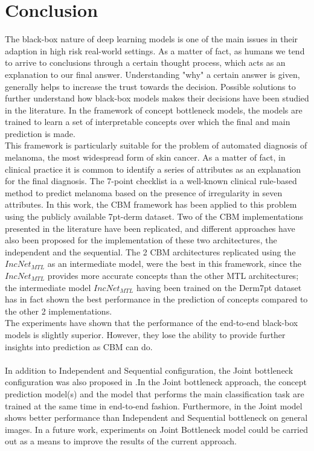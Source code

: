\graphicspath{{chapters/chapter6/}}
\chapter{Conclusion} \label{chapter6}
The black-box nature of deep learning models is one of the main issues in their adaption in high risk real-world settings. As a matter of fact, as humans we tend to arrive to conclusions through a certain thought process, which acts as an explanation to our final answer. Understanding "why" a certain answer is given, generally helps to increase the trust towards the decision.
Possible solutions to further understand how black-box models makes their decisions have been studied in the literature. In the framework of concept bottleneck models, the models are trained to learn a set of interpretable concepts over which the final and main prediction is made.\\
This framework is particularly suitable for the problem of automated diagnosis of melanoma, the most widespread form of skin cancer. As a matter of fact, in clinical practice it is common to identify a series of attributes as an explanation for the final diagnosis. The 7-point checklist ia a well-known clinical rule-based method to predict melanoma based on the presence of irregularity in seven attributes.
In this work, the CBM framework has been applied to this problem using the publicly available 7pt-derm dataset. Two of the CBM implementations presented in the literature have been replicated, and different approaches have also been proposed for the implementation of these two architectures, the independent and the sequential.
The 2 CBM architectures replicated using the $ IncNet_ {MTL} $ as an intermediate model, were the best in this framework, since the $ IncNet_ {MTL} $ provides more accurate concepts than the other MTL architectures; the intermediate model $ IncNet_ {MTL} $ having been trained on the Derm7pt dataset has in fact shown the best performance in the prediction of concepts compared to the other 2 implementations. \\
The experiments have shown that the performance of the end-to-end black-box models is slightly superior. However, they lose the ability to provide further insights into prediction as CBM can do.\\\\
In addition to Independent and Sequential configuration, the Joint bottleneck configuration was also proposed in \cite{CBM}.In the Joint bottleneck approach, the concept prediction model(s) and the model that performs the main classification task are trained at the same time in end-to-end fashion. Furthermore, in \cite{CBM} the Joint model shows better performance than Independent and Sequential bottleneck on general images. In a future work, experiments on Joint Bottleneck model could be carried out as a means to improve the results of the current approach.
